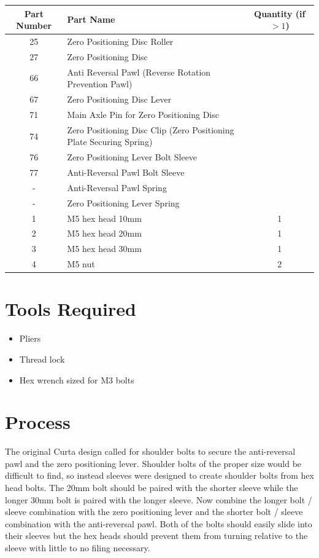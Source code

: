 \documentclass[openany]{book}
\begin{document}
\begin{table}[!ht]
	\centering
	\begin{tabular}{clc}
		Part Number & Part Name & Quantity (if $>1$) \\ \hline
		25 & Zero Positioning Disc Roller & \\
		27 & Zero Positioning Disc & \\
		66 & Anti Reversal Pawl (Reverse Rotation Prevention Pawl) & \\
		67 & Zero Positioning Disc Lever & \\
		71 & Main Axle Pin for Zero Positioning Disc & \\
		74 & Zero Positioning Disc Clip (Zero Positioning Plate Securing Spring) & \\
		76 & Zero Positioning Lever Bolt Sleeve & \\
		77 & Anti-Reversal Pawl Bolt Sleeve & \\ \hline \hline
		- & Anti-Reversal Pawl Spring & \\
		- & Zero Positioning Lever Spring & \\ \hline \hline
		1 & M5 hex head 10mm & 1 \\
		2 & M5 hex head 20mm & 1 \\
		3 & M5 hex head 30mm & 1 \\
		4 & M5 nut & 2
	\end{tabular}
\end{table}

\section{Tools Required}
\begin{itemize}
	\item Pliers
	\item Thread lock
	\item Hex wrench sized for M3 bolts
\end{itemize}


\section{Process}
The original Curta design called for shoulder bolts to secure the anti-reversal pawl and the zero positioning lever. Shoulder bolts of the proper size would be difficult to find, so instead sleeves were designed to create shoulder bolts from hex head bolts. The 20mm bolt should be paired with the shorter sleeve while the longer 30mm bolt is paired with the longer sleeve. Now combine the longer bolt / sleeve combination with the zero positioning lever and the shorter bolt / sleeve combination with the anti-reversal pawl. Both of the bolts should easily slide into their sleeves but the hex heads should prevent them from turning relative to the sleeve with little to no filing necessary.
\end{document}
